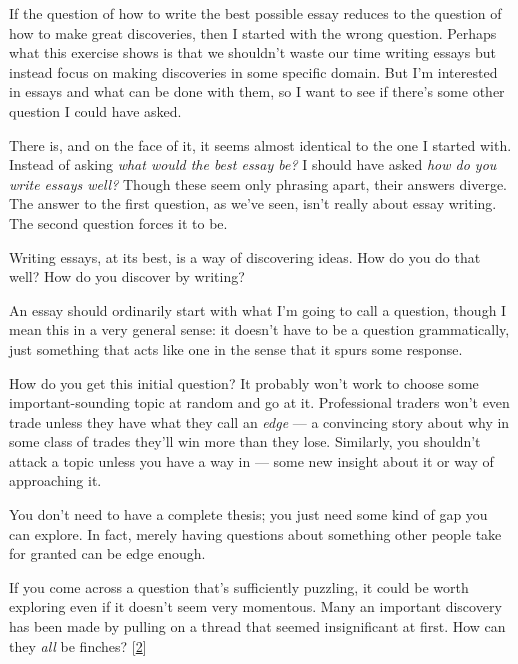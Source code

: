 If
                  the question of how to write the best possible essay reduces
                  to the question of how to make great discoveries, then I
                  started with the wrong question. Perhaps what this exercise
                  shows is that we shouldn't waste our time writing essays but
                  instead focus on making discoveries in some specific domain.
                  But I'm interested in essays and what can be done with them,
                  so I want to see if there's some other question I could have
                  asked.

There is, and on the face of it, it seems
                  almost identical to the one I started with. Instead of asking
                  \emph{what would the best essay be?} I should have asked
                  \emph{how do you write essays well?} Though these seem only
                  phrasing apart, their answers diverge. The answer to the first
                  question, as we've seen, isn't really about essay writing. The
                  second question forces it to be.

Writing essays, at
                  its best, is a way of discovering ideas. How do you do that
                  well? How do you discover by writing?

An essay
                  should ordinarily start with what I'm going to call a
                  question, though I mean this in a very general sense: it
                  doesn't have to be a question grammatically, just something
                  that acts like one in the sense that it spurs some
                  response.

How do you get this initial question? It
                  probably won't work to choose some important-sounding topic at
                  random and go at it. Professional traders won't even trade
                  unless they have what they call an \emph{edge} --- a
                  convincing story about why in some class of trades they'll win
                  more than they lose. Similarly, you shouldn't attack a topic
                  unless you have a way in --- some new insight about it or
                  way of approaching it.

You don't need to have a
                  complete thesis; you just need some kind of gap you can
                  explore. In fact, merely having questions about something
                  other people take for granted can be edge enough.

If
                  you come across a question that's sufficiently puzzling, it
                  could be worth exploring even if it doesn't seem very
                  momentous. Many an important discovery has been made by
                  pulling on a thread that seemed insignificant at first. How
                  can they \emph{all} be finches?
                  [\href{\#f2n}{2}]

